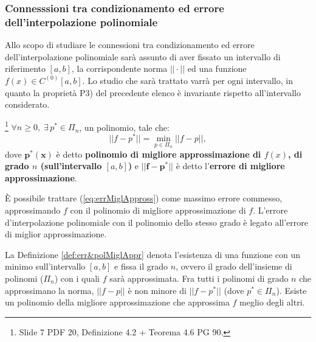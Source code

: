 \subsubsection{Connesssioni tra condizionamento ed errore dell'interpolazione polinomiale}
\footnotemark Allo scopo di studiare le connessioni tra condizionamento ed errore dell'interpolazione polinomiale sarà assunto di aver fissato un intervallo di riferimento $[a,b]$, la corrispondente norma $||\cdot||$ ed una funzione $f(x)\in C^{(0)}[a,b]$. Lo studio che sarà trattato varrà per ogni intervallo, in quanto la proprietà P3) del precedente elenco è invariante rispetto all'intervallo considerato.

\begin{definition}\label{def:err&polMiglAppr}\footnote{Slide 7 PDF 20, Definizione 4.2 + Teorema 4.6 PG 90.}
    $\forall n\geq 0,\;\exists\, p^*\in\Pi_n$, un polinomio, tale che:
    \begin{equation}\label{eq:errMiglAppross}
        ||f-p^*||=\underset{p\in\Pi_n}{\min}||f-p||,
    \end{equation}
    dove $\boldsymbol{p^*(x)}$ è detto \textbf{polinomio di migliore approssimazione di $f(x)$, di grado $n$ (sull'intervallo $[a,b]$)} e $\boldsymbol{||f-p^*||}$ è detto l'\textbf{errore di migliore approssimazione}.
\end{definition}

\begin{remark}
    È possibile trattare (\ref{eq:errMiglAppross}) come massimo errore commesso, approssimando $f$ con il polinomio di migliore approssimazione di $f$. L'errore d'interpolazione polinomiale con il polinomio dello stesso grado è legato all'errore di miglior approssimazione.
\end{remark}

La Definizione \ref{def:err&polMiglAppr} denota l'esistenza di una funzione con un minimo sull'intervallo $[a,b]$ e fissa il grado $n$, ovvero il grado dell'insieme di polinomi ($\Pi_n$) con i quali $f$ sarà approssimata.
Fra tutti i polinomi di grado $n$ che approssimano la norma, $||f-p||$ è non minore di $||f-p^*||$ (dove $p^*\in\Pi_n$). Esiste un polinomio della migliore approssimazione che approssima $f$ meglio degli altri.

